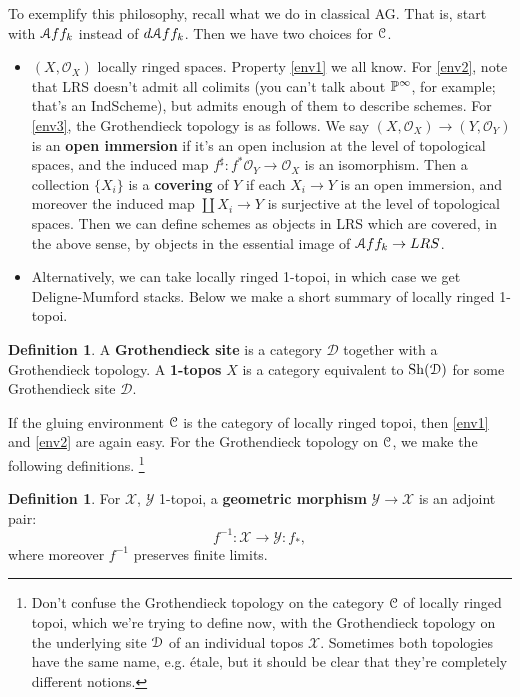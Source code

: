 \documentclass[10pt,a4paper,reqno,oneside]{book} %
\theoremstyle{plain}
\theoremstyle{definition}
\newtheorem{defin}[thm]{Definition}
\theoremstyle{remark}
\numberwithin{equation}{section}
\begin{document}
To exemplify this philosophy, recall what we do in classical AG. That is, start with $\mathcal A ff_k$ instead of $d \mathcal A ff_k$. 
Then we have two choices for $\mathcal C$.
\begin{itemize}
\item $(X,\mathcal{O}_X)$ locally ringed spaces. Property \ref{env1} we all know. For \ref{env2}, note that LRS doesn't admit
all colimits (you can't talk about $\mathbb P^{\infty}$, for example; that's an IndScheme), but admits enough of them
to describe schemes. For \ref{env3}, the Grothendieck topology is as follows. We say $(X, \mathcal{O}_X) \to (Y,\mathcal{O}_Y)$ is an
\textbf{open immersion} if it's an open inclusion at the level of topological spaces, and the induced map $f^{\sharp}
: f^* \mathcal{O}_Y \to \mathcal{O}_X$ is an isomorphism. Then a collection $\{X_i\}$ is a \textbf{covering} of $Y$ if
each $X_i \to Y$ is an open immersion, and moreover the induced map $\coprod X_i \to Y$ is surjective at the level of topological
spaces. 
Then we can define schemes as objects in LRS which are covered, in the above sense, by objects in the essential
image of $\mathcal A ff_k \to LRS$.

\item Alternatively, we can take locally ringed 1-topoi, in which case we get Deligne-Mumford stacks. Below we make a short
summary of locally ringed 1-topoi.
\end{itemize}

\begin{defin}
A \textbf{Grothendieck site} is a category $\mathcal{D}$ together with a Grothendieck topology. A \textbf{1-topos} $X$
is a category equivalent to $\mathrm{Sh}(\mathcal{D})$ for some Grothendieck site $\mathcal{D}$.
\end{defin}

If the gluing environment $\mathcal C$ is the category of locally ringed topoi, then \ref{env1}
and \ref{env2} are again easy. For the Grothendieck topology on $\mathcal C$, we make the following definitions.
\footnote{Don't confuse the Grothendieck topology on the category $\mathcal C$ of locally ringed topoi, which we're trying to
define now, with the Grothendieck topology on the underlying site $\mathcal D$ of an individual topos $\mathcal{X}$. Sometimes
both topologies have the same name, e.g. \'etale, but it should be clear that they're completely different notions.}

\begin{defin}
For $\mathcal{X}$, $\mathcal{Y}$ 1-topoi, a \textbf{geometric morphism} $\mathcal{Y} \to \mathcal{X}$ is an adjoint pair:
\[	f^{-1} : \mathcal{X} \to \mathcal{Y} : f_*,	\] 
where moreover $f^{-1}$ preserves finite limits.
\end{defin}
\end{document}
